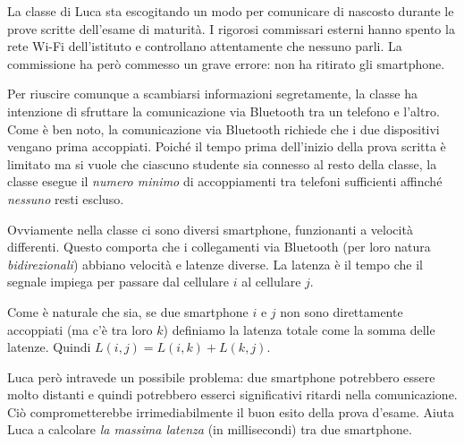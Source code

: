 \usepackage{xcolor}
\usepackage{afterpage}
\usepackage{pifont,mdframed}
\usepackage[bottom]{footmisc}
\usepackage{hyperref}

\makeatletter
\gdef\this@inputfilename{input.txt}
\gdef\this@outputfilename{output.txt}
\makeatother

\newcommand{\inputfile}{\texttt{input.txt}}
\newcommand{\outputfile}{\texttt{output.txt}}

\newenvironment{warning}
  {\par\begin{mdframed}[linewidth=2pt,linecolor=gray]%
    \begin{list}{}{\leftmargin=1cm
                   \labelwidth=\leftmargin}\item[\Large\ding{43}]}
  {\end{list}\end{mdframed}\par}

    La classe di Luca sta escogitando un modo per comunicare di nascosto durante le prove scritte dell'esame di maturità. I rigorosi commissari esterni hanno spento la rete Wi-Fi dell'istituto e controllano attentamente che nessuno parli. La commissione ha però commesso un grave errore: non ha ritirato gli smartphone.

    Per riuscire comunque a scambiarsi informazioni segretamente, la classe ha intenzione di sfruttare la comunicazione via Bluetooth tra un telefono e l'altro. Come è ben noto, la comunicazione via Bluetooth richiede che i due dispositivi vengano prima accoppiati. Poiché il tempo prima dell'inizio della prova scritta è limitato ma si vuole che ciascuno studente sia connesso al resto della classe, la classe esegue il \emph{numero minimo} di accoppiamenti tra telefoni sufficienti affinché \emph{nessuno} resti escluso.

    Ovviamente nella classe ci sono diversi smartphone, funzionanti a velocità differenti. Questo comporta che i collegamenti via Bluetooth (per loro natura \emph{bidirezionali}) abbiano velocità e latenze diverse. La latenza è il tempo che il segnale impiega per passare dal cellulare $i$ al cellulare $j$.

    Come è naturale che sia, se due smartphone $i$ e $j$ non sono direttamente accoppiati (ma c'è tra loro $k$) definiamo la latenza totale come la somma delle latenze. Quindi $L(i, j) = L(i, k) + L(k, j)$.

    Luca però intravede un possibile problema: due smartphone potrebbero essere molto distanti e quindi potrebbero esserci significativi ritardi nella comunicazione. Ciò comprometterebbe irrimediabilmente il buon esito della prova d'esame. Aiuta Luca a calcolare \emph{la massima latenza} (in millisecondi) tra due smartphone.

